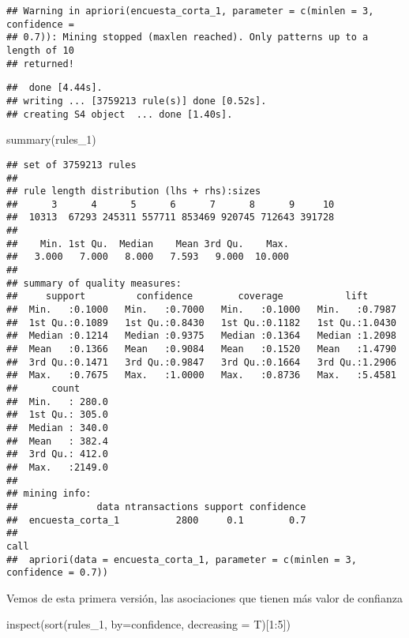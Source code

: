 \documentclass[
]{article}
\newenvironment{Shaded}{\begin{snugshade}}{\end{snugshade}}
\newcommand{\AttributeTok}[1]{\textcolor[rgb]{0.77,0.63,0.00}{#1}}
\newcommand{\DecValTok}[1]{\textcolor[rgb]{0.00,0.00,0.81}{#1}}
\newcommand{\FunctionTok}[1]{\textcolor[rgb]{0.00,0.00,0.00}{#1}}
\newcommand{\NormalTok}[1]{#1}
\newcommand{\SpecialCharTok}[1]{\textcolor[rgb]{0.00,0.00,0.00}{#1}}
\newcommand{\StringTok}[1]{\textcolor[rgb]{0.31,0.60,0.02}{#1}}
\begin{document}
\begin{verbatim}
## Warning in apriori(encuesta_corta_1, parameter = c(minlen = 3, confidence =
## 0.7)): Mining stopped (maxlen reached). Only patterns up to a length of 10
## returned!
\end{verbatim}

\begin{verbatim}
##  done [4.44s].
## writing ... [3759213 rule(s)] done [0.52s].
## creating S4 object  ... done [1.40s].
\end{verbatim}

\begin{Shaded}
\begin{Highlighting}[]
\FunctionTok{summary}\NormalTok{(rules\_1)}
\end{Highlighting}
\end{Shaded}

\begin{verbatim}
## set of 3759213 rules
## 
## rule length distribution (lhs + rhs):sizes
##      3      4      5      6      7      8      9     10 
##  10313  67293 245311 557711 853469 920745 712643 391728 
## 
##    Min. 1st Qu.  Median    Mean 3rd Qu.    Max. 
##   3.000   7.000   8.000   7.593   9.000  10.000 
## 
## summary of quality measures:
##     support         confidence        coverage           lift       
##  Min.   :0.1000   Min.   :0.7000   Min.   :0.1000   Min.   :0.7987  
##  1st Qu.:0.1089   1st Qu.:0.8430   1st Qu.:0.1182   1st Qu.:1.0430  
##  Median :0.1214   Median :0.9375   Median :0.1364   Median :1.2098  
##  Mean   :0.1366   Mean   :0.9084   Mean   :0.1520   Mean   :1.4790  
##  3rd Qu.:0.1471   3rd Qu.:0.9847   3rd Qu.:0.1664   3rd Qu.:1.2906  
##  Max.   :0.7675   Max.   :1.0000   Max.   :0.8736   Max.   :5.4581  
##      count       
##  Min.   : 280.0  
##  1st Qu.: 305.0  
##  Median : 340.0  
##  Mean   : 382.4  
##  3rd Qu.: 412.0  
##  Max.   :2149.0  
## 
## mining info:
##              data ntransactions support confidence
##  encuesta_corta_1          2800     0.1        0.7
##                                                                           call
##  apriori(data = encuesta_corta_1, parameter = c(minlen = 3, confidence = 0.7))
\end{verbatim}

Vemos de esta primera versión, las asociaciones que tienen más valor de
confianza

\begin{Shaded}
\begin{Highlighting}[]
\FunctionTok{inspect}\NormalTok{(}\FunctionTok{sort}\NormalTok{(rules\_1, }\AttributeTok{by=}\StringTok{\textquotesingle{}confidence\textquotesingle{}}\NormalTok{, }\AttributeTok{decreasing =}\NormalTok{ T)[}\DecValTok{1}\SpecialCharTok{:}\DecValTok{5}\NormalTok{])}
\end{Highlighting}
\end{Shaded}
\end{document}
